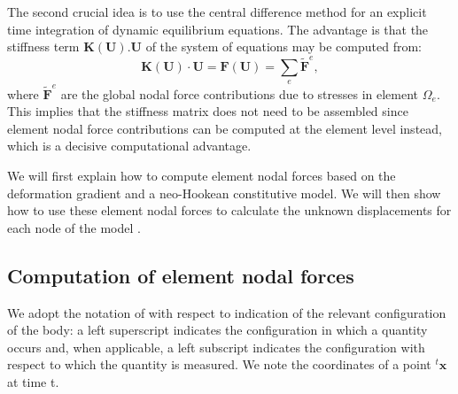 The second crucial idea is to use the central difference method for an explicit time integration of dynamic equilibrium equations. The advantage is that the stiffness term $ \mathbf{K(\mathbf{U}).\mathbf{U}} $ of the system of equations may be computed from:
\begin{equation}
\mathbf{K(\mathbf{U}) \cdot \mathbf{U}} = \mathbf{F}(\mathbf{U}) = \sum_e \mathbf{\tilde{F}}^e,
\end{equation}
where $ \mathbf{\tilde{F}}^e $ are the global nodal force contributions due to stresses in element $ \Omega_e $. This implies that the stiffness matrix does not need to be assembled since element nodal force contributions can be computed at the element level instead, which is a decisive computational advantage. 

We will first explain how to compute element nodal forces based on the deformation gradient and a neo-Hookean constitutive model. We will then show how to use these element nodal forces to calculate the unknown displacements for each node of the model \citep{Taylor06}. 


	\subsection{Computation of element nodal forces} 
	
We adopt the notation of \citeauthor{Bathe95} with respect to indication of the relevant configuration of the body: a left superscript indicates the configuration in which a quantity occurs and, when applicable, a left subscript indicates the configuration with respect to which the quantity is measured. We note the coordinates of a point $ ^t \mathbf{x}$ at time t. 

